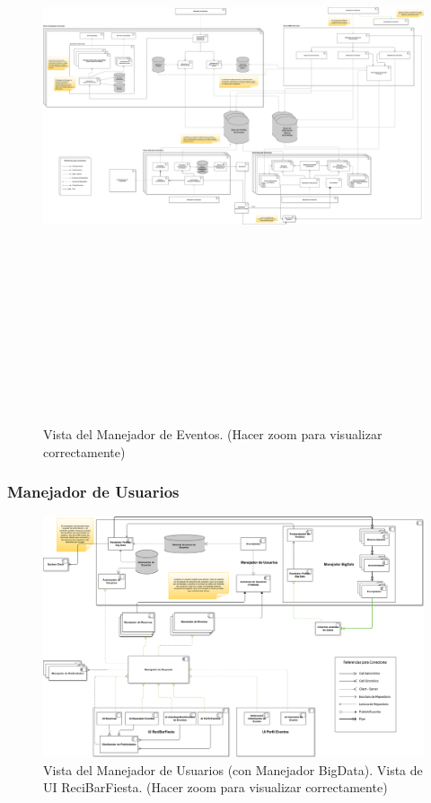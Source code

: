 \begin{figure}[H]
  \centering
  \includegraphics[angle=90,height=18cm]{diagramas/ManejadorDeEventos.png}
  \caption{\normalfont Vista del Manejador de Eventos. (Hacer zoom para visualizar correctamente)}
\end{figure} 

\subsubsection{Manejador de Usuarios}

\begin{figure}[H]
  \centering
  \includegraphics[width=\textwidth]{diagramas/ManejadorDeUsuarios.png}
  \caption{\normalfont Vista del Manejador de Usuarios (con Manejador BigData). Vista de UI ReciBarFiesta. (Hacer zoom para visualizar correctamente)}
\end{figure} 

